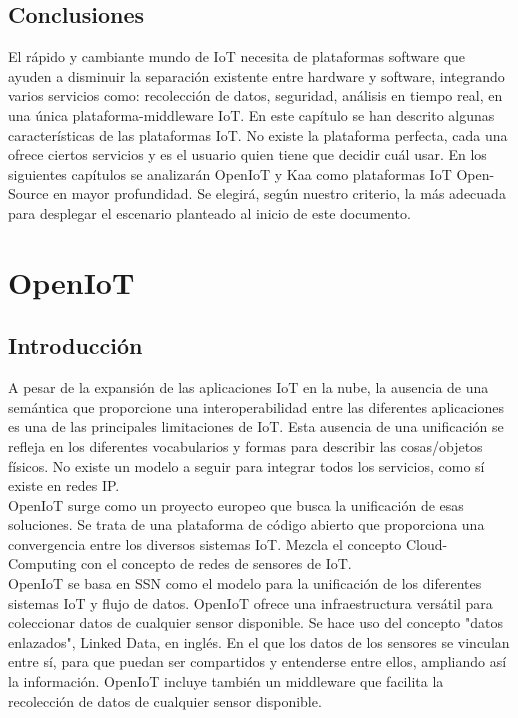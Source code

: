 \documentclass[12pt, twoside]{book}
\begin{document}
\section{Conclusiones}
El rápido y cambiante mundo de IoT necesita de plataformas software que ayuden a disminuir la separación existente entre hardware y software, integrando varios servicios como: recolección de datos, seguridad, análisis en tiempo real, en una única plataforma-middleware IoT. En este capítulo se han descrito algunas características de las plataformas IoT. No existe la plataforma perfecta, cada una ofrece ciertos servicios y es el usuario quien tiene que decidir cuál usar. En los siguientes capítulos se analizarán OpenIoT y Kaa como plataformas IoT Open-Source en mayor profundidad. Se elegirá, según nuestro criterio, la más adecuada para desplegar el escenario planteado al inicio de este documento.
\chapter{OpenIoT}
\section{Introducción}
A pesar de la expansión de las aplicaciones IoT en la nube, la ausencia de una semántica que proporcione una interoperabilidad entre las diferentes aplicaciones es una de las principales limitaciones de IoT. Esta ausencia de una unificación se refleja en los diferentes vocabularios y formas para describir las cosas/objetos físicos. No existe un modelo a seguir para integrar todos los servicios, como sí existe en redes IP. \\

OpenIoT\cite{openiot}\cite{openiot_git}\cite{openiot_pdf} surge como un proyecto europeo que busca la unificación de esas soluciones. Se trata de una plataforma de código abierto que proporciona una convergencia entre los diversos sistemas IoT. Mezcla el concepto Cloud-Computing con el concepto de redes de sensores de IoT.\\ 

OpenIoT se basa en SSN como el modelo para la unificación de los diferentes sistemas IoT y flujo de datos. OpenIoT ofrece una infraestructura versátil para coleccionar datos de cualquier sensor disponible. Se hace uso del concepto "datos enlazados", Linked Data, en inglés. En el que los datos de los sensores se vinculan entre sí, para que puedan ser compartidos y entenderse entre ellos, ampliando así la información. OpenIoT incluye también un middleware que facilita la recolección de datos de cualquier sensor disponible.
\end{document}
